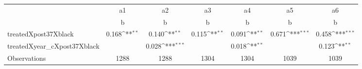 {
\def\sym#1{\ifmmode^{#1}\else\(^{#1}\)\fi}
\begin{tabular}{l*{6}{c}}
\toprule
                    &          a1         &          a2         &          a3         &          a4         &          a5         &          a6         \\
                    &           b         &           b         &           b         &           b         &           b         &           b         \\
\midrule
treatedXpost37Xblack&       0.168\sym{**} &       0.140\sym{**} &       0.115\sym{**} &       0.091\sym{**} &       0.671\sym{***}&       0.458\sym{***}\\
treatedXyear\_cXpost37Xblack&                     &       0.028\sym{***}&                     &       0.018\sym{**} &                     &       0.123\sym{**} \\
\midrule
Observations        &        1288         &        1288         &        1304         &        1304         &        1039         &        1039         \\
\bottomrule
\end{tabular}
}
